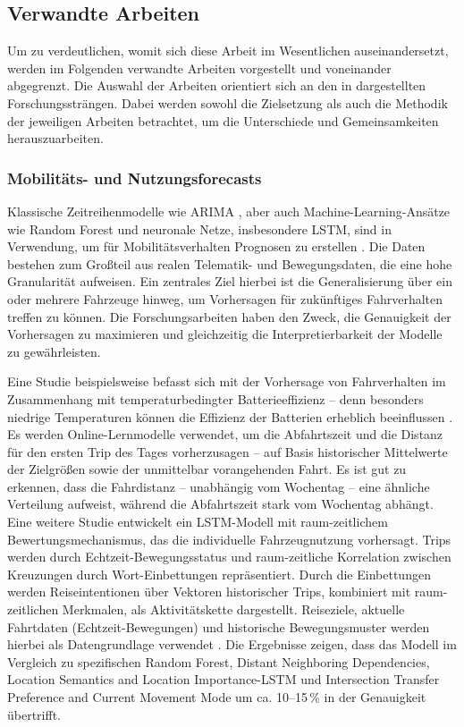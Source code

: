 \subsection{Verwandte Arbeiten}
\label{sec:verwandte_arbeiten}

Um zu verdeutlichen, womit sich diese Arbeit im Wesentlichen auseinandersetzt, werden im Folgenden verwandte Arbeiten vorgestellt und voneinander abgegrenzt. Die Auswahl der Arbeiten orientiert sich an den in  dargestellten Forschungssträngen. Dabei werden sowohl die Zielsetzung als auch die Methodik der jeweiligen Arbeiten betrachtet, um die Unterschiede und Gemeinsamkeiten herauszuarbeiten.

\subsubsection{Mobilitäts- und Nutzungsforecasts}

Klassische Zeitreihenmodelle wie ARIMA \parencite[Kap. 9]{hyndman2021forecasting}, aber auch Machine-Learning-Ansätze wie Random Forest und neuronale Netze, insbesondere LSTM, sind in Verwendung, um für Mobilitätsverhalten Prognosen zu erstellen \parencite{lindroth2024online,individual2025activitychain}. Die Daten bestehen zum Großteil aus realen Telematik- und Bewegungsdaten, die eine hohe Granularität aufweisen. Ein zentrales Ziel hierbei ist die Generalisierung über ein oder mehrere Fahrzeuge hinweg, um Vorhersagen für zukünftiges Fahrverhalten treffen zu können. Die Forschungsarbeiten haben den Zweck, die Genauigkeit der Vorhersagen zu maximieren und gleichzeitig die Interpretierbarkeit der Modelle zu gewährleisten. 

Eine Studie beispielsweise befasst sich mit der Vorhersage von Fahrverhalten im Zusammenhang mit temperaturbedingter Batterieeffizienz -- denn besonders niedrige Temperaturen können die Effizienz der Batterien erheblich beeinflussen \parencite{lindroth2024online}. Es werden Online-Lernmodelle verwendet, um die Abfahrtszeit und die Distanz für den ersten Trip des Tages vorherzusagen -- auf Basis historischer Mittelwerte der Zielgrößen sowie der unmittelbar vorangehenden Fahrt. Es ist gut zu erkennen, dass die Fahrdistanz -- unabhängig vom Wochentag -- eine ähnliche Verteilung aufweist, während die Abfahrtszeit stark vom Wochentag abhängt. Eine weitere Studie entwickelt ein LSTM-Modell mit raum-zeitlichem Bewertungsmechanismus, das die individuelle Fahrzeugnutzung vorhersagt. Trips werden durch Echtzeit-Bewegungsstatus und raum-zeitliche Korrelation zwischen Kreuzungen durch Wort-Einbettungen repräsentiert. Durch die Einbettungen werden Reiseintentionen über Vektoren historischer Trips, kombiniert mit raum-zeitlichen Merkmalen, als Aktivitätskette dargestellt. Reiseziele, aktuelle Fahrtdaten (Echtzeit-Bewegungen) und historische Bewegungsmuster werden hierbei als Datengrundlage verwendet \parencite{individual2025activitychain}. Die Ergebnisse zeigen, dass das Modell im Vergleich zu spezifischen Random Forest, Distant Neighboring Dependencies, Location Semantics and Location Importance-LSTM und Intersection Transfer Preference and Current Movement Mode um ca. 10--15\,\% in der Genauigkeit übertrifft. 

